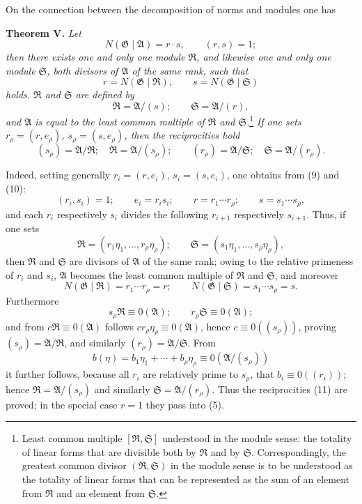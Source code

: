 \documentclass[11pt]{article}
\providecommand{\Amod}{\mathfrak A}
\providecommand{\Gmod}{\mathfrak G}
\providecommand{\Rmod}{\mathfrak R}
\providecommand{\Smod}{\mathfrak S}
\providecommand{\zero}[1]{\equiv 0(#1)}
\providecommand{\Norm}{N}
\providecommand{\Amod}{\mathfrak A}
\providecommand{\Gmod}{\mathfrak G}
\providecommand{\Smod}{\mathfrak S}
\providecommand{\zero}[1]{\equiv 0\pmod{#1}}
\providecommand{\Norm}{N}
\providecommand{\Norm}{\operatorname{N}}
\providecommand{\Norm}{\operatorname{N}}
\begin{document}
On the connection between the decomposition of norms and modules one has

\medskip
\noindent\textbf{Theorem V.} \emph{Let}
\begin{equation}
 \Norm(\Gmod\mid\Amod)=r\cdot s,\qquad (r,s)=1;
\tag{10}
\end{equation}
\emph{then there exists one and only one module $\Rmod$, and likewise one and only one module $\Smod$, both divisors of $\Amod$ of the same rank, such that}
\[
 r=\Norm(\Gmod\mid\Rmod),\qquad s=\Norm(\Gmod\mid\Smod)
\]
\emph{holds. $\Rmod$ and $\Smod$ are defined by}
\[
 \Rmod=\Amod/(s);\qquad \Smod=\Amod/(r),
\]
\emph{and $\Amod$ is equal to the least common multiple of $\Rmod$ and $\Smod$.}\footnote{Least common multiple $[\Rmod,\Smod]$ understood in the module sense: the totality of linear forms that are divisible both by $\Rmod$ and by $\Smod$. Correspondingly, the greatest common divisor $(\Rmod,\Smod)$ in the module sense is to be understood as the totality of linear forms that can be represented as the sum of an element from $\Rmod$ and an element from $\Smod$.}
\emph{If one sets $r_\rho=(r,e_\rho)$, $s_\rho=(s,e_\rho)$, then the reciprocities hold}
\begin{equation}
 (s_\rho)=\Amod/\Rmod;\quad \Rmod=\Amod/(s_\rho);
 \qquad
 (r_\rho)=\Amod/\Smod;\quad \Smod=\Amod/(r_\rho).
\tag{11}
\end{equation}

Indeed, setting generally $r_i=(r,e_i)$, $s_i=(s,e_i)$, one obtains from (9) and (10):
\[
 (r_i,s_i)=1;\qquad e_i=r_is_i;\qquad r=r_1\cdots r_\rho;\qquad s=s_1\cdots s_\rho,
\]
and each $r_i$ respectively $s_i$ divides the following $r_{i+1}$ respectively $s_{i+1}$. Thus, if one sets
\[
 \Rmod=(r_1\eta_1,\ldots,r_\rho\eta_\rho);\qquad
 \Smod=(s_1\eta_1,\ldots,s_\rho\eta_\rho),
\]
then $\Rmod$ and $\Smod$ are divisors of $\Amod$ of the same rank; owing to the relative primeness of $r_i$ and $s_i$, $\Amod$ becomes the least common multiple of $\Rmod$ and $\Smod$, and moreover
\[
 \Norm(\Gmod\mid\Rmod)=r_1\cdots r_\rho=r;\qquad
 \Norm(\Gmod\mid\Smod)=s_1\cdots s_\rho=s.
\]
Furthermore
\[
 s_\rho\Rmod\zero{\Amod};\qquad r_\rho\Smod\zero{\Amod};
\]
and from $c\Rmod\zero{\Amod}$ follows $cr_\rho\eta_\rho\zero{\Amod}$, hence $c\zero{(s_\rho)}$, proving $(s_\rho)=\Amod/\Rmod$, and similarly $(r_\rho)=\Amod/\Smod$. From
\[
 b(\eta)=b_1\eta_1+\cdots+b_\rho\eta_\rho\zero{\Amod/(s_\rho)}
\]
it further follows, because all $r_i$ are relatively prime to $s_\rho$, that $b_i\zero{(r_i)}$; hence $\Rmod=\Amod/(s_\rho)$ and similarly $\Smod=\Amod/(r_\rho)$. Thus the reciprocities (11) are proved; in the special case $r=1$ they pass into (5).
\end{document}
